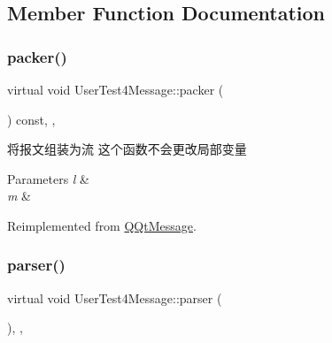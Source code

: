\subsection{Member Function Documentation}
\mbox{\label{class_user_test4_message_a3fc63f87f26e82c43b4cb5f55971cde7}} 
\subsubsection{\texorpdfstring{packer()}{packer()}}
{\footnotesize\ttfamily virtual void User\+Test4\+Message\+::packer (\begin{DoxyParamCaption}\item[{Q\+Byte\+Array \&}]{ }\end{DoxyParamCaption}) const\hspace{0.3cm}{\ttfamily [inline]}, {\ttfamily [override]}, {\ttfamily [virtual]}}



将报文组装为流 这个函数不会更改局部变量 


\begin{DoxyParams}{Parameters}
{\em l} & \\
\hline
{\em m} & \\
\hline
\end{DoxyParams}


Reimplemented from \mbox{\hyperlink{class_q_qt_message_af1885c2c3628495808dca66ee8d72e14}{Q\+Qt\+Message}}.

\mbox{\label{class_user_test4_message_ab3baa9085d706a56fd96b9bcfd2e99fe}} 
\subsubsection{\texorpdfstring{parser()}{parser()}}
{\footnotesize\ttfamily virtual void User\+Test4\+Message\+::parser (\begin{DoxyParamCaption}\item[{const Q\+Byte\+Array \&}]{ }\end{DoxyParamCaption})\hspace{0.3cm}{\ttfamily [inline]}, {\ttfamily [override]}, {\ttfamily [virtual]}}



